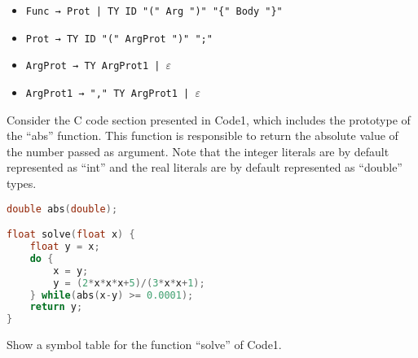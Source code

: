 \documentclass[docid=2021]{comp_exam_round1}
\begin{document}
\begin{itemize}[wide, noitemsep]
    \item \texttt{Func → Prot | TY ID "(" Arg ")" "\{" Body "\}"}
    \item \texttt{Prot → TY ID "(" ArgProt ")" ";"}
    \item \texttt{ArgProt → TY ArgProt1 | $\varepsilon$}
    \item \texttt{ArgProt1 → "," TY ArgProt1 | $\varepsilon$}
\end{itemize}

\examgroup{}

Consider the C code section presented in Code1, which includes the prototype of the “abs” function. This function is responsible to return the absolute value of the number passed as argument. Note that the integer literals are by default represented as “int” and the real literals are by default represented as “double” types.

\begin{lstlisting}[caption=Code1, language=c]
double abs(double);

float solve(float x) {
    float y = x;
    do {
        x = y;
        y = (2*x*x*x+5)/(3*x*x+1);
    } while(abs(x-y) >= 0.0001);
    return y;
}
\end{lstlisting}

\question
Show a symbol table for the function “solve” of Code1.

\ansseparator
\end{document}
